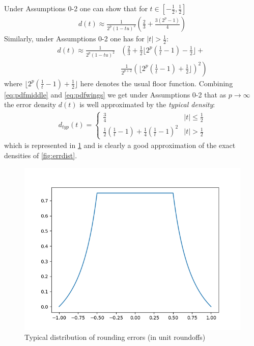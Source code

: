 \documentclass[10pt,conference]{IEEEtran}
\newcommand{\floor}[1]{\lfloor #1 \rfloor}
\newcommand{\absv}[1]{\vert #1\vert}
\begin{document}
Under Assumptions 0-2 one can show that for $t\in\left[-\frac{1}{2},\frac{1}{2}\right]$
\begin{align}
d(t)\approx\frac{1}{2^p(1-tu)^2}\left(\frac{2}{3}+\frac{3(2^{p}-1)}{4}\right)\label{eq:pdfmiddle}
\end{align}
Similarly, under Assumptions 0-2 one has for $\absv{t}>\frac{1}{2}$:
\begin{align}
d(t)\approx\frac{1}{2^p(1-tu)^2}& \left(\frac{2}{3}+\frac{1}{2}\floor{2^p(\frac{1}{t}-1)-\frac{1}{2}}+\right. \nonumber 
\\
&\left.\frac{1}{2^{p+2}}(\floor{2^p(\frac{1}{t}-1)+\frac{1}{2}})^2\right)\label{eq:pdfwings}
\end{align}
where $\floor{2^p(\frac{1}{t}-1)+\frac{1}{2}}$ here denotes the usual floor function.
Combining \cref{eq:pdfmiddle} and \cref{eq:pdfwings} we get under Assumptions 0-2 that as $p\to\infty$ the error density $d(t)$ is well approximated by the \emph{typical density}:
\begin{align}
d_{typ}(t)=\begin{cases}
\frac{3}{4}&\absv{t}\leq\frac{1}{2}
\\
\frac{1}{2}\left(\frac{1}{t}-1\right)+\frac{1}{4}\left(\frac{1}{t}-1\right)^2 & \absv{t}>\frac{1}{2}
\end{cases}\label{eq:typicalpdf}
\end{align} 
which is represented in \cref{fig:typical} and is clearly a good approximation of the exact densities of \cref{fig:errdist}.
\begin{figure}[ht!]
\includegraphics[scale=0.55]{pics/typical_dist}
\caption{Typical distribution of rounding errors (in unit roundoffs)}
\label{fig:typical}
\end{figure}
\end{document}
